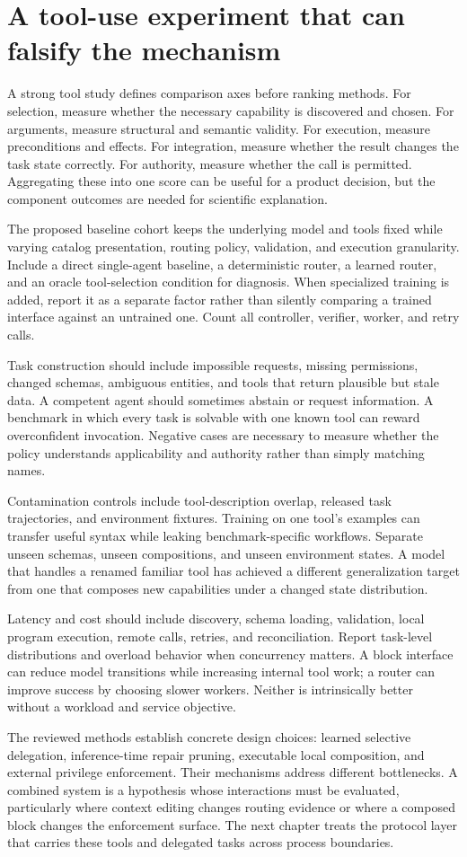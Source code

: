 \section{A tool-use experiment that can falsify the mechanism}\label{sec:C18:evaluation}
A strong tool study defines comparison axes before ranking methods. For selection, measure whether the necessary capability is discovered and chosen. For arguments, measure structural and semantic validity. For execution, measure preconditions and effects. For integration, measure whether the result changes the task state correctly. For authority, measure whether the call is permitted. Aggregating these into one score can be useful for a product decision, but the component outcomes are needed for scientific explanation.

The proposed baseline cohort keeps the underlying model and tools fixed while varying catalog presentation, routing policy, validation, and execution granularity. Include a direct single-agent baseline, a deterministic router, a learned router, and an oracle tool-selection condition for diagnosis. When specialized training is added, report it as a separate factor rather than silently comparing a trained interface against an untrained one. Count all controller, verifier, worker, and retry calls.

Task construction should include impossible requests, missing permissions, changed schemas, ambiguous entities, and tools that return plausible but stale data. A competent agent should sometimes abstain or request information. A benchmark in which every task is solvable with one known tool can reward overconfident invocation. Negative cases are necessary to measure whether the policy understands applicability and authority rather than simply matching names.

Contamination controls include tool-description overlap, released task trajectories, and environment fixtures. Training on one tool's examples can transfer useful syntax while leaking benchmark-specific workflows. Separate unseen schemas, unseen compositions, and unseen environment states. A model that handles a renamed familiar tool has achieved a different generalization target from one that composes new capabilities under a changed state distribution.

Latency and cost should include discovery, schema loading, validation, local program execution, remote calls, retries, and reconciliation. Report task-level distributions and overload behavior when concurrency matters. A block interface can reduce model transitions while increasing internal tool work; a router can improve success by choosing slower workers. Neither is intrinsically better without a workload and service objective.

The reviewed methods establish concrete design choices: learned selective delegation, inference-time repair pruning, executable local composition, and external privilege enforcement. Their mechanisms address different bottlenecks. A combined system is a hypothesis whose interactions must be evaluated, particularly where context editing changes routing evidence or where a composed block changes the enforcement surface. The next chapter treats the protocol layer that carries these tools and delegated tasks across process boundaries.
